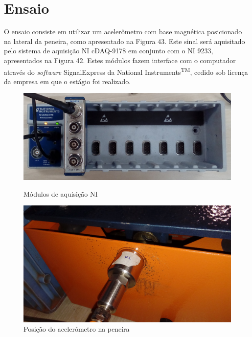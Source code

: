 \documentclass[11pt]{abntex2}
\begin{document}
				\newpage

			\section{Ensaio}
				O ensaio consiste em utilizar um acelerômetro com base magnética
				posicionado na lateral da peneira, como apresentado na Figura
				43. Este sinal será aquisitado pelo sistema de aquisição NI
				cDAQ-9178 em conjunto com o NI 9233, apresentados na Figura 42.
				Estes módulos fazem interface com o computador através do
				\textit{software} SignalExpress da National
				Instruments\textsuperscript{TM}, cedido sob licença da empresa
				em que o estágio foi realizado.

				\begin{figure}[!ht]
					\centering
					\begin{minipage}{0.4\linewidth}
						\centering
						\includegraphics[width = \linewidth]{../Fotos/cdaq.jpg}
						\caption{Módulos de aquisição NI}
					\end{minipage}
					\hfill\vline\hfill
					\begin{minipage}{0.4\linewidth}
						\centering
						\includegraphics[width = \linewidth]{../Fotos/peneiraLateralZoom.jpg}
						\caption{Posição do acelerômetro na peneira}
					\end{minipage}
				\end{figure}
\end{document}
